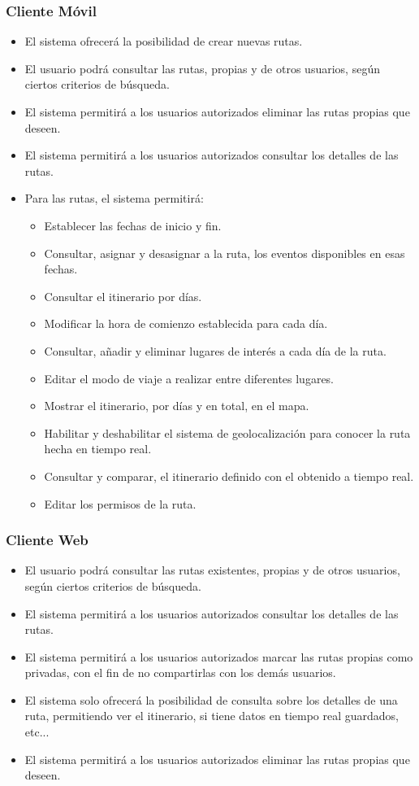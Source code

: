 \subsubsection*{Cliente Móvil}
\begin{itemize}
\setlength\itemsep{1pt}
\item El sistema ofrecerá la posibilidad de crear nuevas rutas.
\item El usuario podrá consultar las rutas, propias y de otros usuarios, según ciertos criterios de búsqueda.
\item El sistema permitirá a los usuarios autorizados eliminar las rutas propias que deseen.
\item El sistema permitirá a los usuarios autorizados consultar los detalles de las rutas.
\item Para las rutas, el sistema permitirá:
	\begin{itemize}
	\item Establecer las fechas de inicio y fin.
	\item Consultar, asignar y desasignar a la ruta, los eventos disponibles en esas fechas.
	\item Consultar el itinerario por días.
	\item Modificar la hora de comienzo establecida para cada día.
	\item Consultar, añadir y eliminar lugares de interés a cada día de la ruta.
	\item Editar el modo de viaje a realizar entre diferentes lugares.
	\item Mostrar el itinerario, por días y en total, en el mapa.
	\item Habilitar y deshabilitar el sistema de geolocalización para conocer la ruta hecha en tiempo real.
	\item Consultar y comparar, el itinerario definido con el obtenido a tiempo real.
	\item Editar los permisos de la ruta.
	\end{itemize}
\end{itemize}

\subsubsection*{Cliente Web}
\begin{itemize}
\setlength\itemsep{1pt}
\item El usuario podrá consultar las rutas existentes, propias y de otros usuarios, según ciertos criterios de búsqueda.
\item El sistema permitirá a los usuarios autorizados consultar los detalles de las rutas.
\item El sistema permitirá a los usuarios autorizados marcar las rutas propias como privadas, con el fin de no compartirlas con los demás usuarios.
\item El sistema solo ofrecerá la posibilidad de consulta sobre los detalles de una ruta, permitiendo ver el itinerario, si tiene datos en tiempo real guardados, etc...
\item El sistema permitirá a los usuarios autorizados eliminar las rutas propias que deseen.
\end{itemize}

